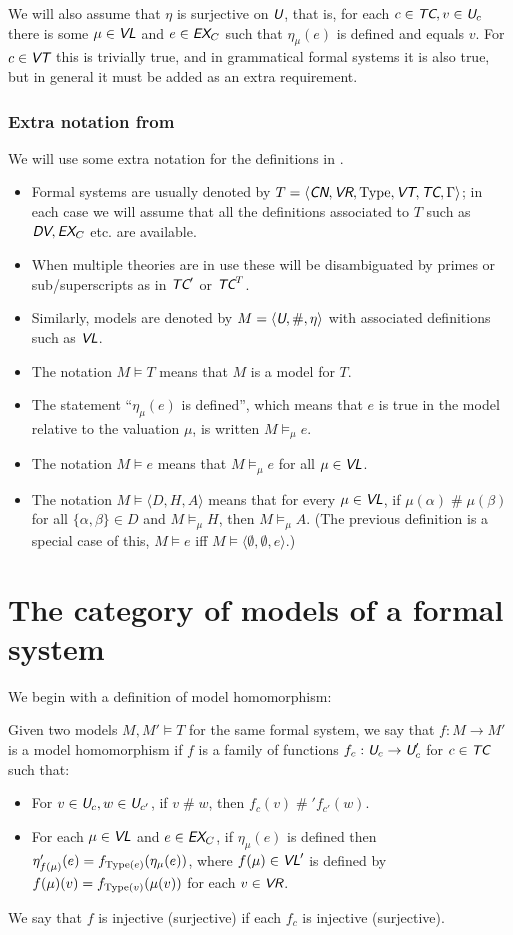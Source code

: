 \documentclass[runningheads,a4paper]{llncs}
\newcommand{\cn}{\textit{\textsf{CN}}} %
\newcommand{\vr}{\textit{\textsf{VR}}} %
\newcommand{\ec}{\textit{\textsf{EX}}_C} %
\newcommand{\dv}{\textit{\textsf{DV}}} %
\newcommand{\tc}{\textit{\textsf{TC}}} %
\newcommand{\vt}{\textit{\textsf{VT}}} %
\newcommand{\vl}{\textit{\textsf{VL}}} %
\newcommand{\uv}{\textit{\textsf{U}}} %
\newcommand{\ang}[1]{\langle#1\rangle}
\newcommand{\type}{{\rm Type}}
\newcommand{\fresh}{\mathbin{\#}}
\begin{document}
We will also assume that $\eta$ is surjective on $\uv$, that is, for each $c\in\tc,v\in\uv_c$ there is some $\mu\in\vl$ and $e\in\ec$ such that $\eta_\mu(e)$ is defined and equals $v$. For $c\in\vt$ this is trivially true, and in grammatical formal systems it is also true, but in general it must be added as an extra requirement.

\subsubsection{Extra notation from \cite{models}}
We will use some extra notation for the definitions in \cite{models}.
\begin{itemize}
  \item Formal systems are usually denoted by $T=\ang{\cn,\vr,\type,\vt,\tc,\Gamma}$; in each case we will assume that all the definitions associated to $T$ such as $\dv,\ec$ etc. are available.
  \item When multiple theories are in use these will be disambiguated by primes or sub/superscripts as in $\tc'$ or $\tc^T$.
  \item Similarly, models are denoted by $M=\ang{\uv,\fresh,\eta}$ with associated definitions such as $\vl$.
  \item The notation $M\models T$ means that $M$ is a model for $T$.
  \item The statement ``$\eta_\mu(e)$ is defined'', which means that $e$ is true in the model relative to the valuation $\mu$, is written $M\models_\mu e$.
  \item The notation $M\models e$ means that $M\models_\mu e$ for all $\mu\in\vl$.
  \item The notation $M\models\ang{D,H,A}$ means that for every $\mu\in\vl$, if $\mu(\alpha)\fresh\mu(\beta)$ for all $\{\alpha,\beta\}\in D$ and $M\models_\mu H$, then $M\models_\mu A$. (The previous definition is a special case of this, $M\models e$ iff $M\models\ang{\emptyset,\emptyset,e}$.)
\end{itemize}

\section{The category of models of a formal system}
We begin with a definition of model homomorphism:
\begin{definition}
Given two models $M,M'\models T$ for the same formal system, we say that $f:M\to M'$ is a model homomorphism if $f$ is a family of functions $f_c:\uv_c\to\uv'_c$ for $c\in\tc$ such that:
\begin{itemize}
  \item For $v\in\uv_c,w\in\uv_{c'}$, if $v\fresh w$, then $f_c(v)\fresh'f_{c'}(w)$.
  \item For each $\mu\in\vl$ and $e\in\ec$, if $\eta_\mu(e)$ is defined then $\eta'_{f(\mu)}(e)=f_{\type(e)}(\eta_\mu(e))$, where $f(\mu)\in\vl'$ is defined by $f(\mu)(v)=f_{\type(v)}(\mu(v))$ for each $v\in\vr$.
\end{itemize}
We say that $f$ is injective (surjective) if each $f_c$ is injective (surjective).
\end{definition}
\end{document}
